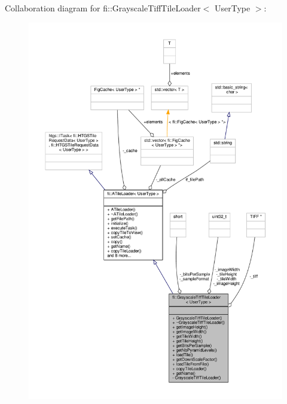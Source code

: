 Collaboration diagram for fi\+:\+:Grayscale\+Tiff\+Tile\+Loader$<$ User\+Type $>$\+:
\nopagebreak
\begin{figure}[H]
\begin{center}
\leavevmode
\includegraphics[width=350pt]{d9/de1/classfi_1_1GrayscaleTiffTileLoader__coll__graph}
\end{center}
\end{figure}
